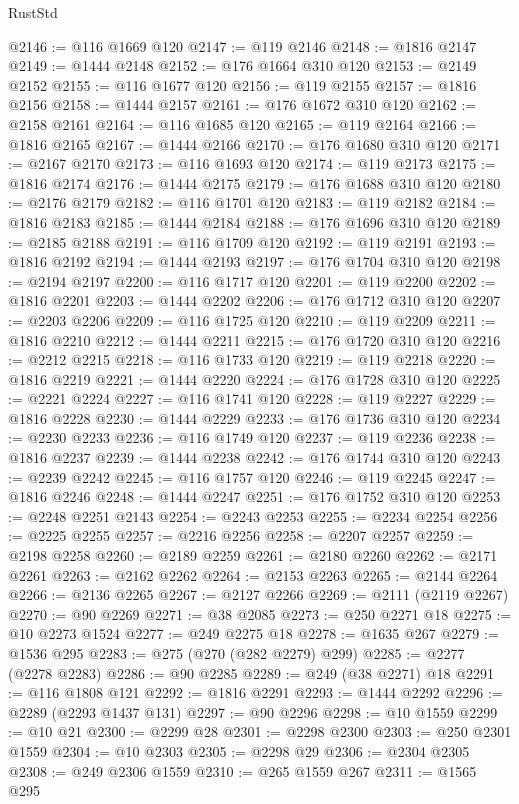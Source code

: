 \begin{lexlean}{RustStd}
\begin{coremodule}
@2146 := @116 @1669 @120
@2147 := @119 @2146
@2148 := @1816 @2147
@2149 := @1444 @2148
@2152 := @176 @1664 @310 @120
@2153 := @2149 @2152
@2155 := @116 @1677 @120
@2156 := @119 @2155
@2157 := @1816 @2156
@2158 := @1444 @2157
@2161 := @176 @1672 @310 @120
@2162 := @2158 @2161
@2164 := @116 @1685 @120
@2165 := @119 @2164
@2166 := @1816 @2165
@2167 := @1444 @2166
@2170 := @176 @1680 @310 @120
@2171 := @2167 @2170
@2173 := @116 @1693 @120
@2174 := @119 @2173
@2175 := @1816 @2174
@2176 := @1444 @2175
@2179 := @176 @1688 @310 @120
@2180 := @2176 @2179
@2182 := @116 @1701 @120
@2183 := @119 @2182
@2184 := @1816 @2183
@2185 := @1444 @2184
@2188 := @176 @1696 @310 @120
@2189 := @2185 @2188
@2191 := @116 @1709 @120
@2192 := @119 @2191
@2193 := @1816 @2192
@2194 := @1444 @2193
@2197 := @176 @1704 @310 @120
@2198 := @2194 @2197
@2200 := @116 @1717 @120
@2201 := @119 @2200
@2202 := @1816 @2201
@2203 := @1444 @2202
@2206 := @176 @1712 @310 @120
@2207 := @2203 @2206
@2209 := @116 @1725 @120
@2210 := @119 @2209
@2211 := @1816 @2210
@2212 := @1444 @2211
@2215 := @176 @1720 @310 @120
@2216 := @2212 @2215
@2218 := @116 @1733 @120
@2219 := @119 @2218
@2220 := @1816 @2219
@2221 := @1444 @2220
@2224 := @176 @1728 @310 @120
@2225 := @2221 @2224
@2227 := @116 @1741 @120
@2228 := @119 @2227
@2229 := @1816 @2228
@2230 := @1444 @2229
@2233 := @176 @1736 @310 @120
@2234 := @2230 @2233
@2236 := @116 @1749 @120
@2237 := @119 @2236
@2238 := @1816 @2237
@2239 := @1444 @2238
@2242 := @176 @1744 @310 @120
@2243 := @2239 @2242
@2245 := @116 @1757 @120
@2246 := @119 @2245
@2247 := @1816 @2246
@2248 := @1444 @2247
@2251 := @176 @1752 @310 @120
@2253 := @2248 @2251 @2143
@2254 := @2243 @2253
@2255 := @2234 @2254
@2256 := @2225 @2255
@2257 := @2216 @2256
@2258 := @2207 @2257
@2259 := @2198 @2258
@2260 := @2189 @2259
@2261 := @2180 @2260
@2262 := @2171 @2261
@2263 := @2162 @2262
@2264 := @2153 @2263
@2265 := @2144 @2264
@2266 := @2136 @2265
@2267 := @2127 @2266
@2269 := @2111 (@2119 @2267)
@2270 := @90 @2269
@2271 := @38 @2085
@2273 := @250 @2271 @18
@2275 := @10 @2273 @1524
@2277 := @249 @2275 @18
@2278 := @1635 @267
@2279 := @1536 @295
@2283 := @275 (@270 (@282 @2279) @299)
@2285 := @2277 (@2278 @2283)
@2286 := @90 @2285
@2289 := @249 (@38 @2271) @18
@2291 := @116 @1808 @121
@2292 := @1816 @2291
@2293 := @1444 @2292
@2296 := @2289 (@2293 @1437 @131)
@2297 := @90 @2296
@2298 := @10 @1559
@2299 := @10 @21
@2300 := @2299 @28
@2301 := @2298 @2300
@2303 := @250 @2301 @1559
@2304 := @10 @2303
@2305 := @2298 @29
@2306 := @2304 @2305
@2308 := @249 @2306 @1559
@2310 := @265 @1559 @267
@2311 := @1565 @295

\end{coremodule}
\end{lexlean}
